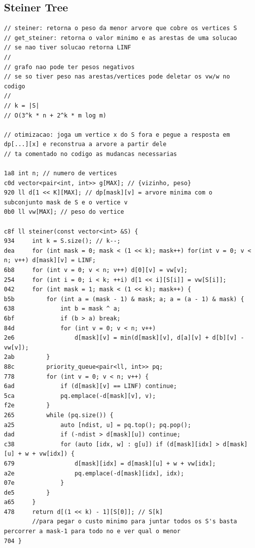 \documentclass[11pt, a4paper, twoside]{article}
\begin{document}
{{\subsection{Steiner Tree}
\begin{lstlisting}
// steiner: retorna o peso da menor arvore que cobre os vertices S
// get_steiner: retorna o valor minimo e as arestas de uma solucao
// se nao tiver solucao retorna LINF
//
// grafo nao pode ter pesos negativos
// se so tiver peso nas arestas/vertices pode deletar os vw/w no codigo
//
// k = |S|
// O(3^k * n + 2^k * m log m)

// otimizacao: joga um vertice x do S fora e pegue a resposta em dp[...][x] e reconstrua a arvore a partir dele
// ta comentado no codigo as mudancas necessarias

1a8 int n; // numero de vertices
c0d vector<pair<int, int>> g[MAX]; // {vizinho, peso}
920 ll d[1 << K][MAX]; // dp[mask][v] = arvore minima com o subconjunto mask de S e o vertice v
0b0 ll vw[MAX]; // peso do vertice

c8f ll steiner(const vector<int> &S) {
934 	int k = S.size(); // k--;
dea 	for (int mask = 0; mask < (1 << k); mask++) for(int v = 0; v < n; v++) d[mask][v] = LINF;
6b8 	for (int v = 0; v < n; v++) d[0][v] = vw[v];
254 	for (int i = 0; i < k; ++i) d[1 << i][S[i]] = vw[S[i]];
042 	for (int mask = 1; mask < (1 << k); mask++) {
b5b 		for (int a = (mask - 1) & mask; a; a = (a - 1) & mask) {
638 			int b = mask ^ a;
6bf 			if (b > a) break;
84d 			for (int v = 0; v < n; v++)
2e6 				d[mask][v] = min(d[mask][v], d[a][v] + d[b][v] - vw[v]);
2ab 		}
88c 		priority_queue<pair<ll, int>> pq;
778 		for (int v = 0; v < n; v++) {
6ad 			if (d[mask][v] == LINF) continue;
5ca 			pq.emplace(-d[mask][v], v);
f2e 		}
265 		while (pq.size()) {
a25 			auto [ndist, u] = pq.top(); pq.pop();
dad 			if (-ndist > d[mask][u]) continue;
c38 			for (auto [idx, w] : g[u]) if (d[mask][idx] > d[mask][u] + w + vw[idx]) {
679 				d[mask][idx] = d[mask][u] + w + vw[idx];
a2e 				pq.emplace(-d[mask][idx], idx);
07e 			}
de5 		}
a65 	}
478 	return d[(1 << k) - 1][S[0]]; // S[k]
        //para pegar o custo minimo para juntar todos os S's basta percorrer a mask-1 para todo no e ver qual o menor
704 }


\end{lstlisting}}}
\end{document}
